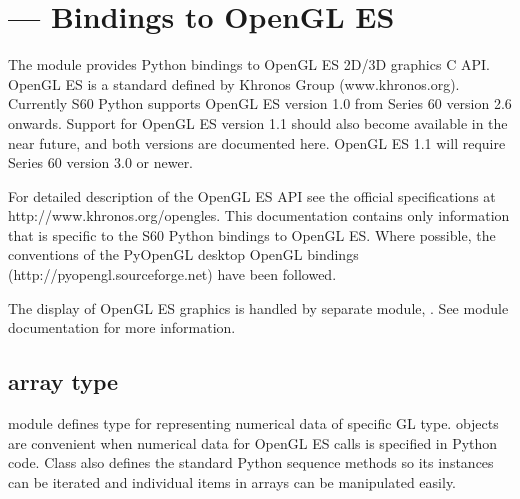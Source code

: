 %
%
%

\section{ ---
  Bindings to OpenGL ES}

\label{sec:gles}

The  module provides Python bindings to OpenGL ES 2D/3D graphics C
API. OpenGL ES is a standard defined by Khronos Group
(www.khronos.org). Currently S60 Python supports OpenGL ES version 1.0 from
Series 60 version 2.6 onwards. Support for OpenGL ES version 1.1 should also
become available in the near future, and both versions are documented
here. OpenGL ES 1.1 will require Series 60 version 3.0 or newer.

For detailed description of the OpenGL ES API see the official specifications at
http://www.khronos.org/opengles. This documentation contains only information
that is specific to the S60 Python bindings to OpenGL ES. Where possible, the
conventions of the PyOpenGL desktop OpenGL bindings
(http://pyopengl.sourceforge.net) have been followed.

The display of OpenGL ES graphics is handled by separate module,
. See  module documentation for more
information.

\subsection{array type}

 module defines  type for representing numerical data of
specific GL type.  objects are convenient when numerical data for
OpenGL ES calls is specified in Python code. Class  also defines
the standard Python sequence methods so its instances can be iterated and
individual items in arrays can be manipulated easily.

